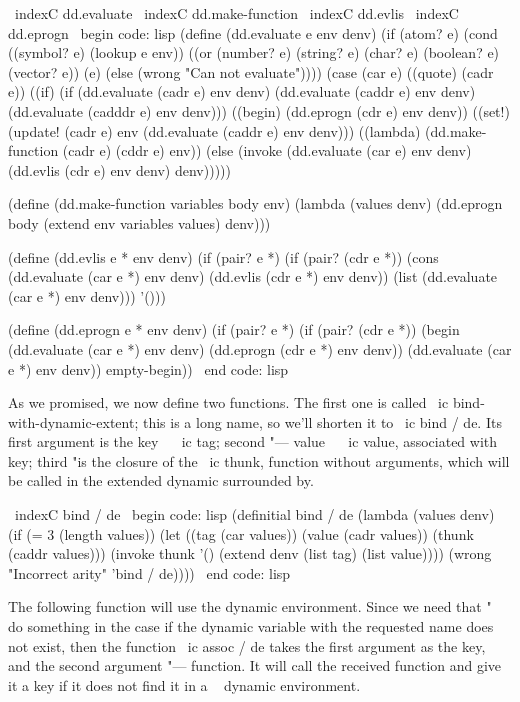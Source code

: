 \ indexC {dd.evaluate}
\ indexC {dd.make-function}
\ indexC {dd.evlis}
\ indexC {dd.eprogn}
\ begin {code: lisp}
(define (dd.evaluate e env denv)
  (if (atom? e)
      (cond ((symbol? e) (lookup e env))
            ((or (number? e) (string? e) (char? e)
                 (boolean? e) (vector? e))
             (e)
            (else (wrong "Can not evaluate"))))
      (case (car e)
        ((quote) (cadr e))
        ((if) (if (dd.evaluate (cadr e) env denv)
                      (dd.evaluate (caddr e) env denv)
                      (dd.evaluate (cadddr e) env denv)))
        ((begin) (dd.eprogn (cdr e) env denv))
        ((set!) (update! (cadr e) env
                           (dd.evaluate (caddr e) env denv)))
        ((lambda) (dd.make-function (cadr e) (cddr e) env))
        (else (invoke (dd.evaluate (car e) env denv)
                      (dd.evlis (cdr e) env denv)
                      denv)))))

(define (dd.make-function variables body env)
  (lambda (values ​​denv)
    (dd.eprogn body (extend env variables values) denv)))

(define (dd.evlis e * env denv)
  (if (pair? e *)
      (if (pair? (cdr e *))
          (cons (dd.evaluate (car e *) env denv)
                (dd.evlis (cdr e *) env denv))
          (list (dd.evaluate (car e *) env denv)))
      '()))

(define (dd.eprogn e * env denv)
  (if (pair? e *)
      (if (pair? (cdr e *))
          (begin (dd.evaluate (car e *) env denv)
                 (dd.eprogn (cdr e *) env denv))
          (dd.evaluate (car e *) env denv))
      empty-begin))
\ end {code: lisp}

As we promised, we now define two functions. The first one is called
\ ic {bind-with-dynamic-extent}; this is a long name, so we'll shorten it to
\ ic {bind / de}. Its first argument is the key ~ \ ic {tag}; second "---
value ~ \ ic {value}, associated with ~ key; third "is the closure of the \ ic {thunk},
function without arguments, which will be called in the extended dynamic
surrounded by.

\ indexC {bind / de}
\ begin {code: lisp}
(definitial bind / de
  (lambda (values ​​denv)
    (if (= 3 (length values))
        (let ((tag (car values))
              (value (cadr values))
              (thunk (caddr values)))
          (invoke thunk '()
                  (extend denv (list tag) (list value))))
        (wrong "Incorrect arity" 'bind / de))))
\ end {code: lisp}

The following function will use the dynamic environment. Since we need
that "~ do something in the case if the dynamic variable with the requested name does not exist,
then the function \ ic {assoc / de} takes the first argument as the key, and the second argument "---
function. It will call the received function and give it a key if it does not find it
in a ~ dynamic environment.

